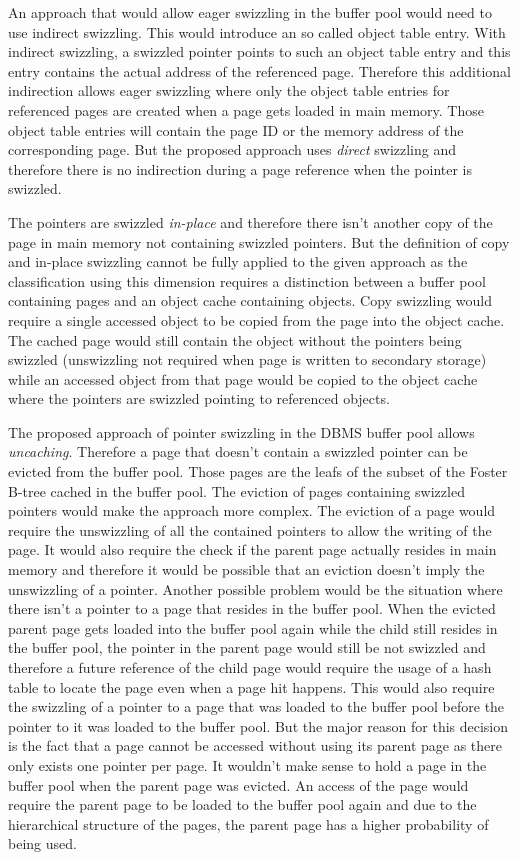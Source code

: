 	An approach that would allow eager swizzling in the buffer pool would need to use indirect swizzling. This would introduce an so called object table entry. With indirect swizzling, a swizzled pointer points to such an object table entry and this entry contains the actual address of the referenced page. Therefore this additional indirection allows eager swizzling where only the object table entries for referenced pages are created when a page gets loaded in main memory. Those object table entries will contain the page ID or the memory address of the corresponding page. But the proposed approach uses \emph{direct} swizzling and therefore there is no indirection during a page reference when the pointer is swizzled.
	
	The pointers are swizzled \emph{in-place} and therefore there isn't another copy of the page in main memory not containing swizzled pointers. But the definition of copy and in-place swizzling cannot be fully applied to the given approach as the classification using this dimension requires a distinction between a buffer pool containing pages and an object cache containing objects. Copy swizzling would require a single accessed object to be copied from the page into the object cache. The cached page would still contain the object without the pointers being swizzled (unswizzling not required when page is written to secondary storage) while an accessed object from that page would be copied to the object cache where the pointers are swizzled pointing to referenced objects.
	
	The proposed approach of pointer swizzling in the DBMS buffer pool allows \emph{uncaching}. Therefore a page that doesn't contain a swizzled pointer can be evicted from the buffer pool. Those pages are the leafs of the subset of the Foster B-tree cached in the buffer pool. The eviction of pages containing swizzled pointers would make the approach more complex. The eviction of a page would require the unswizzling of all the contained pointers to allow the writing of the page. It would also require the check if the parent page actually resides in main memory and therefore it would be possible that an eviction doesn't imply the unswizzling of a pointer. Another possible problem would be the situation where there isn't a pointer to a page that resides in the buffer pool. When the evicted parent page gets loaded into the buffer pool again while the child still resides in the buffer pool, the pointer in the parent page would still be not swizzled and therefore a future reference of the child page would require the usage of a hash table to locate the page even when a page hit happens. This would also require the swizzling of a pointer to a page that was loaded to the buffer pool before the pointer to it was loaded to the buffer pool. But the major reason for this decision is the fact that a page cannot be accessed without using its parent page as there only exists one pointer per page. It wouldn't make sense to hold a page in the buffer pool when the parent page was evicted. An access of the page would require the parent page to be loaded to the buffer pool again and due to the hierarchical structure of the pages, the parent page has a higher probability of being used.
	
